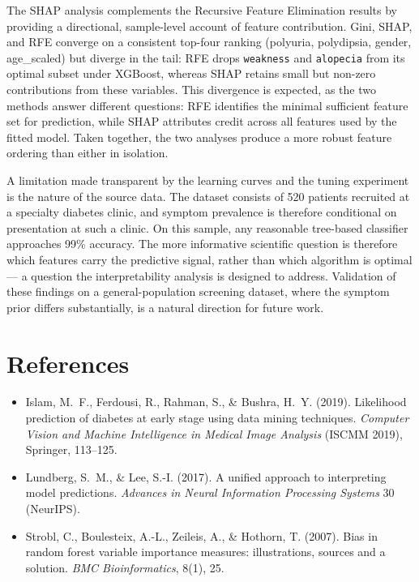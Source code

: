 \documentclass[11pt]{article}
\begin{document}
The SHAP analysis complements the Recursive Feature Elimination results by
providing a directional, sample-level account of feature contribution.
Gini, SHAP, and RFE converge on a consistent top-four ranking (polyuria,
polydipsia, gender, age\_scaled) but diverge in the tail: RFE drops
\texttt{weakness} and \texttt{alopecia} from its optimal subset under
XGBoost, whereas SHAP retains small but non-zero contributions from these
variables. This divergence is expected, as the two methods answer different
questions: RFE identifies the minimal sufficient feature set for prediction,
while SHAP attributes credit across all features used by the fitted model.
Taken together, the two analyses produce a more robust feature ordering
than either in isolation.

A limitation made transparent by the learning curves and the tuning
experiment is the nature of the source data. The dataset consists of 520
patients recruited at a specialty diabetes clinic, and symptom prevalence
is therefore conditional on presentation at such a clinic. On this sample,
any reasonable tree-based classifier approaches 99\% accuracy. The more
informative scientific question is therefore which features carry the
predictive signal, rather than which algorithm is optimal --- a question
the interpretability analysis is designed to address. Validation of these
findings on a general-population screening dataset, where the symptom prior
differs substantially, is a natural direction for future work.


\section*{References}

\begin{itemize}
    \item Islam, M.~F., Ferdousi, R., Rahman, S., \& Bushra, H.~Y. (2019).
    Likelihood prediction of diabetes at early stage using data mining
    techniques. \textit{Computer Vision and Machine Intelligence in Medical
    Image Analysis} (ISCMM 2019), Springer, 113--125.
    \item Lundberg, S.~M., \& Lee, S.-I. (2017). A unified approach to
    interpreting model predictions. \textit{Advances in Neural Information
    Processing Systems} 30 (NeurIPS).
    \item Strobl, C., Boulesteix, A.-L., Zeileis, A., \& Hothorn, T. (2007).
    Bias in random forest variable importance measures: illustrations,
    sources and a solution. \textit{BMC Bioinformatics}, 8(1), 25.
\end{itemize}
\end{document}
